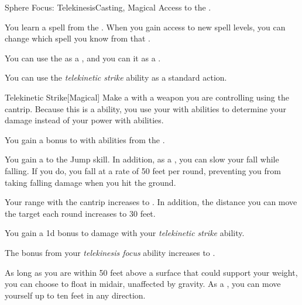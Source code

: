     \begin{feat}{Sphere Focus: Telekinesis}{Casting, Magical}
        \featpre Access to the  .

         You learn a spell from the  .
        When you gain access to new spell levels, you can change which spell you know from that .

         You can use the   as a , and you can  it as a .

         You can use the \textit{telekinetic strike} ability as a standard action.
        \begin{freeability}{Telekinetic Strike}[Magical]
            Make a  with a weapon you are controlling using the  cantrip.
            Because this is a  ability, you use your  with  abilities to determine your damage instead of your power with  abilities.
        \end{freeability}

         You gain a  bonus to  with abilities from the  .

         You gain a   to the Jump skill.
        In addition, as a , you can slow your fall while falling.
        If you do, you fall at a rate of 50 feet per round, preventing you from taking falling damage when you hit the ground.

         Your range with the  cantrip increases to \rngmed.
        In addition, the distance you can move the target each round increases to 30 feet.

         You gain a \plus1d bonus to damage with your \textit{telekinetic strike} ability.

         The bonus from your \textit{telekinesis focus} ability increases to .

         As long as you are within 50 feet above a surface that could support your weight, you can choose to float in midair, unaffected by gravity.
        As a , you can move yourself up to ten feet in any direction.
    \end{feat}

